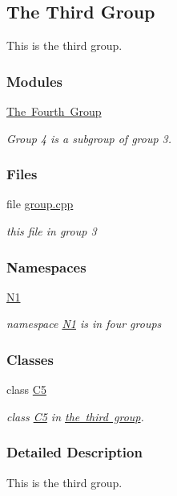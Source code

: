 \hypertarget{group__group3}{}\subsection{The Third Group}
\label{group__group3}


This is the third group.  


\subsubsection*{Modules}
\begin{DoxyCompactItemize}
\item 
\mbox{\hyperlink{group__group4}{The Fourth Group}}
\begin{DoxyCompactList}\small\item\em Group 4 is a subgroup of group 3. \end{DoxyCompactList}\end{DoxyCompactItemize}
\subsubsection*{Files}
\begin{DoxyCompactItemize}
\item 
file \mbox{\hyperlink{group_8cpp}{group.\+cpp}}
\begin{DoxyCompactList}\small\item\em this file in group 3 \end{DoxyCompactList}\end{DoxyCompactItemize}
\subsubsection*{Namespaces}
\begin{DoxyCompactItemize}
\item 
 \mbox{\hyperlink{namespace_n1}{N1}}
\begin{DoxyCompactList}\small\item\em namespace \mbox{\hyperlink{namespace_n1}{N1}} is in four groups \end{DoxyCompactList}\end{DoxyCompactItemize}
\subsubsection*{Classes}
\begin{DoxyCompactItemize}
\item 
class \mbox{\hyperlink{class_c5}{C5}}
\begin{DoxyCompactList}\small\item\em class \mbox{\hyperlink{class_c5}{C5}} in \mbox{\hyperlink{group__group3}{the third group}}. \end{DoxyCompactList}\end{DoxyCompactItemize}


\subsubsection{Detailed Description}
This is the third group. 

